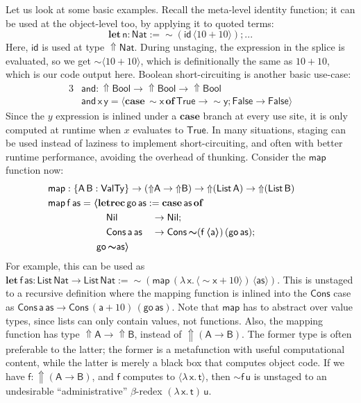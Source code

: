 \documentclass[acmsmall]{acmart}
\newcommand{\mit}[1]{{\mathsf{#1}}}
\newcommand{\msf}[1]{{\mathsf{#1}}}
\newcommand{\mbf}[1]{{\mathbf{#1}}}
\newcommand{\bs}[1]{\boldsymbol{#1}}
\newcommand{\ind}{\hspace{1em}}
\newcommand{\lam}{\lambda\,}
\newcommand{\letrec}{\mbf{letrec}\,}
\newcommand{\of}{\mbf{of}\,}
\newcommand{\go}{\mit{go}}
\newcommand{\letdef}{\mbf{let\,}}
\newcommand{\map}{\mit{map}}
\newcommand{\vas}{\mathsf{as}}
\newcommand{\vn}{\mathsf{n}}
\newcommand{\vA}{\mathsf{A}}
\newcommand{\vB}{\mathsf{B}}
\newcommand{\va}{\mathsf{a}}
\newcommand{\vx}{\mathsf{x}}
\newcommand{\vy}{\mathsf{y}}
\newcommand{\vf}{\mathsf{f}}
\newcommand{\vt}{\mathsf{t}}
\newcommand{\vu}{\mathsf{u}}
\newcommand{\List}{\msf{List}}
\newcommand{\Nil}{\msf{Nil}}
\newcommand{\Cons}{\msf{Cons}}
\newcommand{\Bool}{\msf{Bool}}
\newcommand{\case}{\mbf{case\,}}
\newcommand{\Lift}{{\Uparrow}}
\newcommand{\Up}{{\Uparrow}}
\newcommand{\spl}{{\bs{\sim}}}
\newcommand{\ql}{{\bs{\langle}}}
\newcommand{\qr}{{\bs{\rangle}}}
\newcommand{\VTy}{\msf{ValTy}}
\newcommand{\True}{\msf{True}}
\newcommand{\False}{\msf{False}}
\newcommand{\Nat}{\msf{Nat}}
\theoremstyle{remark}
\newcommand{\id}{\mit{id}}
\newcommand{\qt}[1]{\ql#1\qr}
\begin{document}
Let us look at some basic examples. Recall the meta-level identity function; it
can be used at the object-level too, by applying it to quoted terms:
  \[ \letdef \vn : \Nat := \spl(\id\,\ql 10 + 10 \qr); ... \]
Here, $\id$ is used at type $\Lift \Nat$. During unstaging, the expression in
the splice is evaluated, so we get $\spl\ql 10 + 10 \qr$, which is
definitionally the same as $10 + 10$, which is our code output here. Boolean
short-circuiting is another basic use-case:
\begin{alignat*}{3}
  &\mit{and} : \Up\Bool \to \Up\Bool \to \Up\Bool\\
  &\mit{and}\,\vx\,\vy = \ql\case \spl \vx\,\of \True \to \spl \vy; \False \to \False\qr
\end{alignat*}
Since the $y$ expression is inlined under a $\mbf{case}$ branch at every use site, it
is only computed at runtime when $x$ evaluates to $\True$. In many situations,
staging can be used instead of laziness to implement short-circuiting, and often
with better runtime performance, avoiding the overhead of thunking. Consider the
$\map$ function now:
\begin{alignat*}{3}
  & \hspace{-5em}\mathrlap{\map : \{\vA\,\vB : \VTy\} \to (\Up \vA \to \Up \vB) \to \Up (\List\,\vA) \to \Up(\List\,\vB)}\\
  & \hspace{-5em}\mathrlap{\map\,\vf\,\vas = \ql\letrec \go\,\vas := \case \vas\,\of}\\
  & \hspace{-5em}\ind\ind\ind\ind\ind \ind\Nil             &&\to \Nil;\\
  & \hspace{-5em}\ind\ind\ind\ind\ind \ind\Cons\,\va\,\vas &&\to \Cons\,\spl(\vf\,\ql \va \qr)\,(\go\,\vas);\\
  & \hspace{-5em}\ind\ind\ind\ind\ind\go\,\spl\vas \qr
\end{alignat*}
For example, this can be used as $\letdef \vf\,\vas : \List\,\Nat \to
\List\,\Nat := \spl(\map\,(\lam \vx.\,\ql \spl \vx + 10 \qr)\,\qt{\vas}) $.
This is unstaged to a recursive definition where the mapping function is inlined
into the $\Cons$ case as $\Cons\,\va\,\vas \to \Cons\,(\va + 10)\,(\go\,\vas)$.
Note that $\map$ has to abstract over value types, since lists can only contain
values, not functions. Also, the mapping function has type $\Up \vA \to \Up
\vB$, instead of $\Up (\vA \to \vB)$. The former type is often preferable to the
latter; the former is a metafunction with useful computational content, while
the latter is merely a black box that computes object code. If we have $\vf :
\Up(\vA \to \vB)$, and $\vf$ computes to $\ql \lam \vx.\,\vt\qr$, then $\spl
\vf\,\vu$ is unstaged to an undesirable ``administrative'' $\beta$-redex $(\lam
\vx.\,\vt)\,\vu$.
\end{document}
